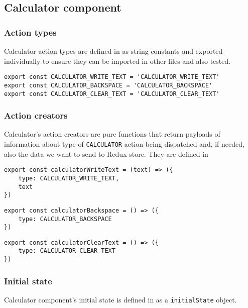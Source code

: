 \subsection{Calculator component}
\subsubsection{Action types}
Calculator action types are defined in  as string constants and exported individually to ensure they can be imported in other files and also tested.

\begin{lstlisting}[caption={\texttt{calculator} action types.},captionpos=b]
export const CALCULATOR_WRITE_TEXT = 'CALCULATOR_WRITE_TEXT'
export const CALCULATOR_BACKSPACE = 'CALCULATOR_BACKSPACE'
export const CALCULATOR_CLEAR_TEXT = 'CALCULATOR_CLEAR_TEXT'
\end{lstlisting}

\subsubsection{Action creators}
Calculator's action creators are pure functions that return payloads of information about type of \texttt{CALCULATOR} action being dispatched and, if needed, also the data we want to send to Redux store. They are defined in 

\begin{lstlisting}[caption={Action for writing text to calculator display.},captionpos=b]
export const calculatorWriteText = (text) => ({
    type: CALCULATOR_WRITE_TEXT,
    text
})
\end{lstlisting}

\begin{lstlisting}[caption={Action to remove character from calculator display.},captionpos=b]
export const calculatorBackspace = () => ({
    type: CALCULATOR_BACKSPACE
})
\end{lstlisting}

\begin{lstlisting}[caption={Action to completely clear the calculator display.},captionpos=b]
export const calculatorClearText = () => ({
    type: CALCULATOR_CLEAR_TEXT
})
\end{lstlisting}

\subsubsection{Initial state}
Calculator component's initial state is defined in  as a \texttt{initialState} object.

